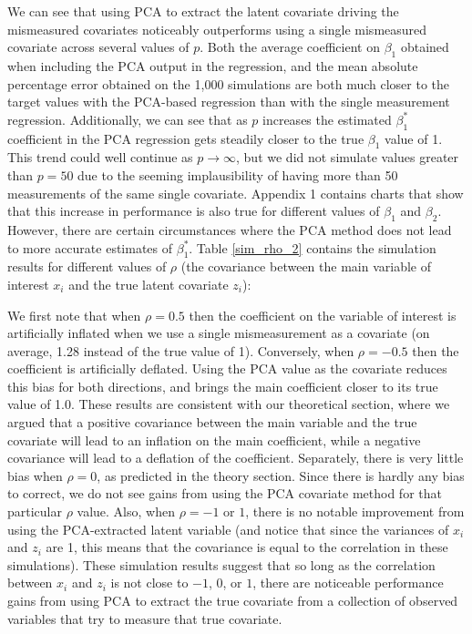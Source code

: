 \documentclass[12pt]{article}
\begin{document}
        

        We can see that using PCA to extract the latent covariate driving the mismeasured covariates noticeably outperforms using a single mismeasured covariate across several values of $p$. Both the average coefficient on $\beta_1$ obtained when including the PCA output in the regression, and the mean absolute percentage error obtained on the 1,000 simulations are both much closer to the target values with the PCA-based regression than with the single measurement regression. Additionally, we can see that as $p$ increases the estimated $\beta_1^*$ coefficient in the PCA regression gets steadily closer to the true $\beta_1$ value of 1. This trend could well continue as $p \to \infty$, but we did not simulate values greater than $p = 50$ due to the seeming implausibility of having more than 50 measurements of the same single covariate. Appendix 1 contains charts that show that this increase in performance is also true for different values of $\beta_1$ and $\beta_2$.\\

        However, there are certain circumstances where the PCA method does not lead to more accurate estimates of $\beta_1^*$. Table \ref{sim_rho_2} contains the simulation results for different values of $\rho$ (the covariance between the main variable of interest $x_i$ and the true latent covariate $z_i$):

        

        We first note that when $\rho = 0.5$ then the coefficient on the variable of interest is artificially inflated when we use a single mismeasurement as a covariate (on average, 1.28 instead of the true value of 1). Conversely, when $\rho = -0.5$ then the coefficient is artificially deflated. Using the PCA value as the covariate reduces this bias for both directions, and brings the main coefficient closer to its true value of 1.0. These results are consistent with our theoretical section, where we argued that a positive covariance between the main variable and the true covariate will lead to an inflation on the main coefficient, while a negative covariance will lead to a deflation of the coefficient. Separately, there is very little bias when $\rho = 0$, as predicted in the theory section. Since there is hardly any bias to correct, we do not see gains from using the PCA covariate method for that particular $\rho$ value. Also, when $\rho = -1$ or $1$, there is no notable improvement from using the PCA-extracted latent variable (and notice that since the variances of $x_i$ and $z_i$ are 1, this means that the covariance is equal to the correlation in these simulations). These simulation results suggest that so long as the correlation between $x_i$ and $z_i$ is not close to $-1$, $0$, or $1$, there are noticeable performance gains from using PCA to extract the true covariate from a collection of observed variables that try to measure that true covariate.\\
        
\end{document}
